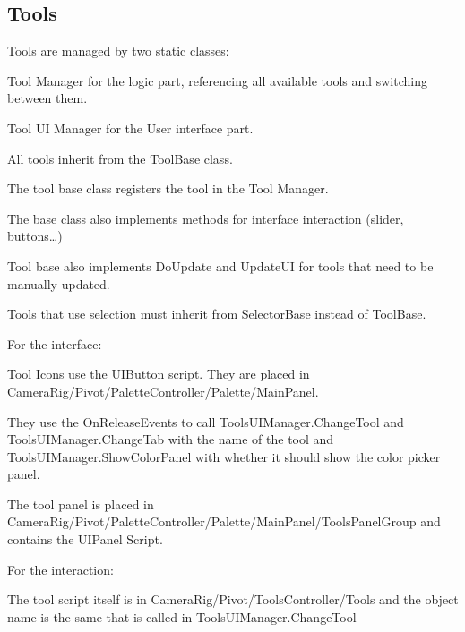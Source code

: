 \documentclass[letterpaper,10pt,english,openany,oneside]{sphinxmanual}
\let\sphinxpxdimen\pdfpxdimen\else\newdimen\sphinxpxdimen
\begin{document}
\subsection{Tools}
\label{\detokenize{ScriptReferences/Script:tools}}
\begin{DUlineblock}{0em}
\item[] Tools are managed by two static classes:
\item[] Tool Manager for the logic part, referencing all available tools and switching between them.
\item[] Tool UI Manager for the User interface part.
\item[] 
\item[] All tools inherit from the ToolBase class.
\item[] The tool base class registers the tool in the Tool Manager.
\item[] The base class also implements methods for interface interaction (slider, buttons…)
\item[] Tool base also implements DoUpdate and UpdateUI for tools that need to be manually updated.
\item[] Tools that use selection must inherit from SelectorBase instead of ToolBase.
\item[] 
\item[] 
\item[] For the interface:
\item[] Tool Icons use the UIButton script. They are placed in CameraRig/Pivot/PaletteController/Palette/MainPanel.
\item[] They use the OnReleaseEvents to call ToolsUIManager.ChangeTool and ToolsUIManager.ChangeTab with the name of the tool and ToolsUIManager.ShowColorPanel with whether it should show the color picker panel.
\item[] 
\end{DUlineblock}

\noindent{\hspace*{\fill}\sphinxincludegraphics[width=300\sphinxpxdimen]{{UIButtonEvents}.png}\hspace*{\fill}}

\begin{DUlineblock}{0em}
\item[] 
\item[] The tool panel is placed in CameraRig/Pivot/PaletteController/Palette/MainPanel/ToolsPanelGroup and contains the UIPanel Script.
\item[] 
\item[] For the interaction:
\item[] The tool script itself is in CameraRig/Pivot/ToolsController/Tools and the object name is the same that is called in ToolsUIManager.ChangeTool
\item[] 
\end{DUlineblock}
\end{document}
